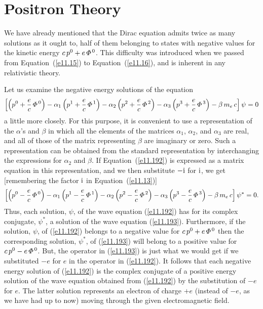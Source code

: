 \section{Positron Theory}
We have already mentioned that the Dirac equation admits twice as many solutions as it ought to, half of them
belonging to states with negative values for the kinetic energy $c\,p^0 + e\,{\mit\Phi}^{\,0}$. This
difficulty was introduced when we passed from Equation~(\ref{e11.15}) to Equation~(\ref{e11.16}), and is inherent in any relativistic theory.

Let us examine the negative energy solutions of the equation
\begin{equation}\label{e11.192}
\left[\left(p^0+\frac{e}{c}\,{\mit\Phi}^{\,0}\right)-\alpha_1\left(p^1+\frac{e}{c}\,{\mit\Phi}^{\,1}\right)-\alpha_2\left(p^2+\frac{e}{c}\,{\mit\Phi}^{\,2}\right)-\alpha_3\left(p^3+\frac{e}{c}\,{\mit\Phi}^{\,3}\right)
-\beta\,m_e\,c\right]\psi=0
\end{equation}
a little more closely. For this purpose, it is convenient to use a representation of the $\alpha$'s and $\beta$
in which all the elements of the matrices $\alpha_1$, $\alpha_2$, and $\alpha_3$ are real, and
all of those of the matrix representing $\beta$ are imaginary or zero. Such a representation can
be obtained from the standard representation by interchanging the expressions for $\alpha_2$ and $\beta$. 
If Equation~(\ref{e11.192}) is expressed as a matrix equation in this representation, and we then substitute $-{\rm i}$ for
${\rm i}$, we get [remembering the factor ${\rm i}$ in Equation~(\ref{e11.13})]
\begin{equation}\label{e11.193}
\left[\left(p^0-\frac{e}{c}\,{\mit\Phi}^{\,0}\right)-\alpha_1\left(p^1-\frac{e}{c}\,{\mit\Phi}^{\,1}\right)-\alpha_2\left(p^2-\frac{e}{c}\,{\mit\Phi}^{\,2}\right)-\alpha_3\left(p^3-\frac{e}{c}\,{\mit\Phi}^{\,3}\right)
-\beta\,m_e\,c\right]\psi^\ast=0.
\end{equation}
Thus, each solution, $\psi$, of the wave equation (\ref{e11.192}) has for its complex conjugate, $\psi^\ast$, a solution of the
wave equation (\ref{e11.193}). Furthermore, if the solution, $\psi$, of (\ref{e11.192})
belongs to a negative value for $c\,p^0 + e\,{\mit\Phi}^{\,0}$ then the corresponding solution, $\psi^\ast$, of (\ref{e11.193})
will belong to a positive value for $c\,p^0-e\,{\mit\Phi}^{\,0}$. But, the operator in (\ref{e11.193}) is
just what we would get if we substituted $-e$ for $e$ in the operator in (\ref{e11.192}). It follows that each negative
energy solution of (\ref{e11.192}) is the complex conjugate of a positive energy solution of the wave equation
obtained from (\ref{e11.192}) by the substitution of $-e$ for $e$. The latter solution represents an electron
of charge $+e$ (instead of $-e$, as we have had up to now) moving through the given electromagnetic field. 

